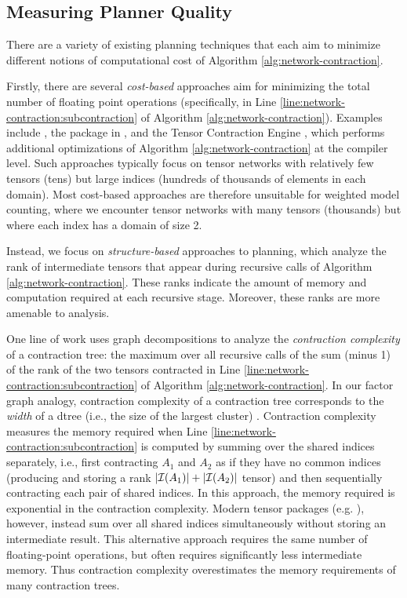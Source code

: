 \subsection{Measuring Planner Quality}
\label{sec:planning:quality}
There are a variety of existing planning techniques that each aim to minimize different notions of computational cost of Algorithm \ref{alg:network-contraction}.

Firstly, there are several \emph{cost-based} approaches aim for minimizing the total number of floating point operations (specifically, in Line \ref{line:network-contraction:subcontraction} of Algorithm \ref{alg:network-contraction}).
Examples include \cite{PHV14}, the  package in , and the Tensor Contraction Engine \cite{Hirata03}, which performs additional optimizations of Algorithm \ref{alg:network-contraction} at the compiler level. %
Such approaches typically focus on tensor networks with relatively few tensors (tens) but large indices (hundreds of thousands of elements in each domain).
Most cost-based approaches are therefore unsuitable for weighted model counting, where we encounter tensor networks with many tensors (thousands) but where each index has a domain of size 2.

Instead, we focus on \emph{structure-based} approaches to planning, which analyze the rank of intermediate tensors that appear during recursive calls of Algorithm \ref{alg:network-contraction}. 
These ranks indicate the amount of memory and computation required at each recursive stage. Moreover, these ranks are more amenable to analysis.

One line of work \cite{MS08,DFGHSW18} uses graph decompositions to analyze the \emph{contraction complexity} of a contraction tree: the maximum over all recursive calls of the sum (minus 1) of the rank of the two tensors contracted in Line \ref{line:network-contraction:subcontraction} of Algorithm \ref{alg:network-contraction}. In our factor graph analogy, contraction complexity of a contraction tree corresponds to the \emph{width} of a dtree (i.e., the size of the largest cluster) \cite{darwiche01b}.
Contraction complexity measures the memory required when Line \ref{line:network-contraction:subcontraction} is computed by summing over the shared indices separately, i.e., first contracting $A_1$ and $A_2$ as if they have no common indices (producing and storing a rank $|\mathcal{I}(A_1)|+|\mathcal{I}(A_2)|$ tensor) and then sequentially contracting each pair of shared indices. In this approach, the memory required is exponential in the contraction complexity. Modern tensor packages (e.g. ), however, instead sum over all shared indices simultaneously without storing an intermediate result. This alternative approach requires the same number of floating-point operations, but often requires significantly less intermediate memory. Thus contraction complexity overestimates the memory requirements of many contraction trees. 

